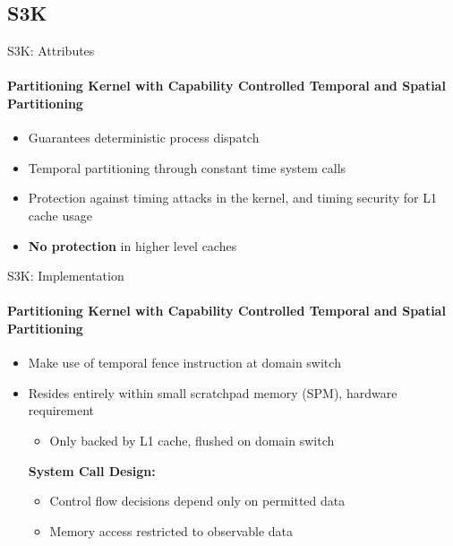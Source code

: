 \subsection{S3K}

\begin{frame}{S3K: Attributes}
  \framesubtitle{Partitioning Kernel with Capability  Controlled Temporal and Spatial Partitioning}
	\begin{itemize}
  \item Guarantees deterministic process dispatch
  \item Temporal partitioning through constant time system calls
  \item Protection against timing attacks in the kernel, and timing security for L1
    cache usage
  \item \textbf{No protection} in higher level caches
	\end{itemize}
\end{frame}

\begin{frame}{S3K: Implementation}
  \framesubtitle{Partitioning Kernel with Capability  Controlled Temporal and Spatial Partitioning}
	\begin{itemize}
  \item Make use of temporal fence instruction at domain switch
  \item Resides entirely within small scratchpad memory (SPM), hardware requirement
  \begin{itemize}
    \item Only backed by L1 cache, flushed on domain switch
  \end{itemize}
	\textbf{System Call Design:}
	\begin{itemize}
		\item Control flow decisions depend only on permitted data
		\item Memory access restricted to observable data
	\end{itemize}
	\end{itemize}
\end{frame}
